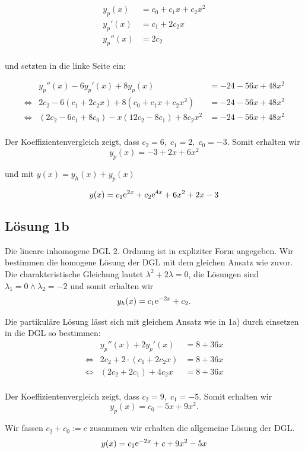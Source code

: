 \documentclass[main.tex]{subfiles}
\begin{document}
\begin{align*}
    y_p(x) &= c_0 + c_1x + c_2x^2 \\
    y_p'(x) &= c_1 + 2c_2x \\
    y_p''(x) &= 2c_2 \\
\end{align*}

und setzten in die linke Seite ein:

\renewcommand{\equiv}{\Leftrightarrow}

\begin{equation*}
\begin{array}{rrl}
       & y_p''(x) - 6y_p'(x) + 8y_p(x) &= -24 -56x + 48x^2 \\[2mm]
\equiv & 2c_2 - 6\left( c_1 + 2c_2x \right) + 8\left( c_0 + c_1x + c_2x^2 \right) &= -24 -56x + 48x^2 \\[2mm]
\equiv & \left(2c_2 - 6c_1 + 8c_0\right) - x \left( 12c_2 - 8c_1\right) + 8c_2x^2 &= -24 -56x + 48x^2 \\[2mm]
\end{array}
\end{equation*}

Der Koeffizientenvergleich zeigt, dass $c_2 = 6,\; c_1 = 2,\; c_0 = -3$. Somit erhalten wir
$$
    y_p(x) = -3 +2x +6x^2
$$

und mit $y(x) = y_h(x) + y_p(x)$

$$
    y(x) = c_1 \mathrm{e}^{2 x} + c_2 \mathrm{e}^{4 x} + 6 x^2 + 2 x - 3
$$

\subsection{Lösung 1b}

Die lineare inhomogene DGL 2. Ordnung ist in expliziter Form angegeben. Wir bestimmen die homogene Lösung der DGL mit dem gleichen Ansatz wie zuvor.
Die charakteristische Gleichung lautet $\lambda^2 + 2\lambda =0$, die Lösungen sind $\lambda_1 = 0 \land \lambda_2 = -2$ und somit erhalten wir
\begin{align*}
    y_h(x) = c_1\mathrm{e}^{-2x} + c_2.\\
\end{align*}

Die partikuläre Lösung lässt sich mit gleichem Ansatz wie in 1a) durch einsetzen in die DGL so bestimmen:
\begin{equation*}
\begin{array}{rrl}
       & y_p''(x) + 2y_p'(x) &= 8 + 36x \\[2mm]
\equiv & 2c_2 + 2\cdot \left(c_1 + 2c_2x\right) &= 8 + 36x \\
\equiv & \left(2c_2 + 2c_1\right) + 4c_2x &= 8 + 36x \\
\end{array}
\end{equation*}

Der Koeffizientenvergleich zeigt, dass $c_2 = 9,\; c_1 = -5$. Somit erhalten wir
$$
    y_p(x) = c_0 -5x + 9x^2.
$$

Wir fassen $c_2 + c_0 := c$ zusammen wir erhalten die allgemeine Lösung der DGL.
$$
    y(x) = c_1 \mathrm{e}^{-2 x} + c + 9x^2 - 5x
$$
\pagebreak
\end{document}
